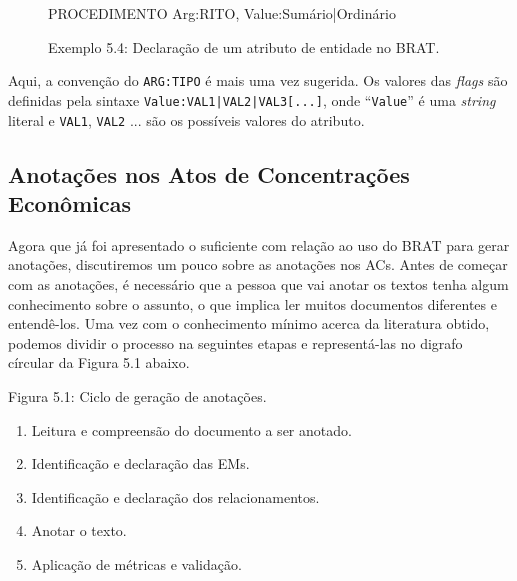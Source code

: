 \documentclass[11pt]{report}
\newcommand{\quotes}[1]{``#1''}
\begin{document}
\begin{figure}[h!]
\centering
\begin{boxedverbatim}
[attributes]

PROCEDIMENTO  Arg:RITO, Value:Sumário|Ordinário
\end{boxedverbatim}
\caption*{Exemplo 5.4: Declaração de um atributo de entidade no BRAT.}
\end{figure}

Aqui, a convenção do \texttt{ARG:TIPO} é mais uma vez sugerida. Os valores das \textit{flags} são definidas pela sintaxe \texttt{Value:VAL1|VAL2|VAL3[...]}, onde
\quotes{\texttt{Value}} é uma \textit{string} literal e \texttt{VAL1}, \texttt{VAL2} ... são os possíveis valores do atributo.

\subsection{Anotações nos Atos de Concentrações Econômicas}

\indent\indent Agora que já foi apresentado o suficiente com relação ao uso do BRAT para gerar anotações, discutiremos um pouco sobre as anotações nos ACs. Antes de começar
com as anotações, é necessário que a pessoa que vai anotar os textos tenha algum conhecimento sobre o assunto, o que implica ler muitos documentos diferentes e entendê-los.
Uma vez com o conhecimento mínimo acerca da literatura obtido, podemos dividir o processo na seguintes etapas e representá-las no digrafo círcular da Figura 5.1 abaixo.

\begin{center}
\end{center}

\begin{center}
  Figura 5.1: Ciclo de geração de anotações.
\end{center}

\begin{enumerate}[label=\textbf{{\arabic*.}}]
\item Leitura e compreensão do documento a ser anotado.
\item Identificação e declaração das EMs.
\item Identificação e declaração dos relacionamentos.
\item Anotar o texto.
\item Aplicação de métricas e validação.
\end{enumerate}
\end{document}
